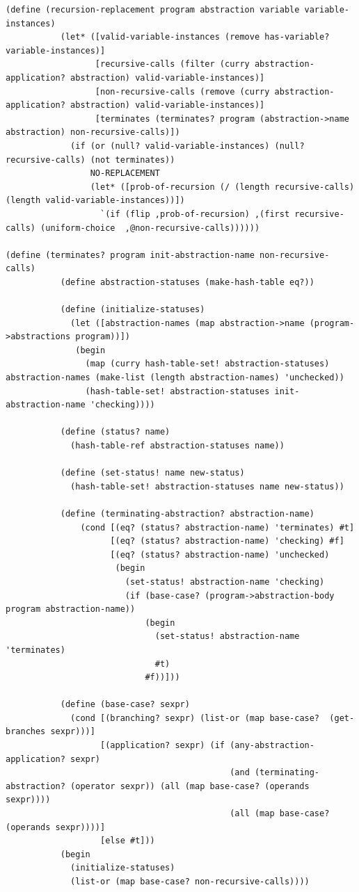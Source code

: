 \documentclass[a4paper,10pt]{article}
\begin{document}
\begin{lstlisting}[frame=trBL]
(define (recursion-replacement program abstraction variable variable-instances)
           (let* ([valid-variable-instances (remove has-variable? variable-instances)]
                  [recursive-calls (filter (curry abstraction-application? abstraction) valid-variable-instances)]
                  [non-recursive-calls (remove (curry abstraction-application? abstraction) valid-variable-instances)]
                  [terminates (terminates? program (abstraction->name abstraction) non-recursive-calls)]) 
             (if (or (null? valid-variable-instances) (null? recursive-calls) (not terminates))
                 NO-REPLACEMENT
                 (let* ([prob-of-recursion (/ (length recursive-calls) (length valid-variable-instances))])
                   `(if (flip ,prob-of-recursion) ,(first recursive-calls) (uniform-choice  ,@non-recursive-calls))))))

(define (terminates? program init-abstraction-name non-recursive-calls)
           (define abstraction-statuses (make-hash-table eq?))

           (define (initialize-statuses)
             (let ([abstraction-names (map abstraction->name (program->abstractions program))])
              (begin
                (map (curry hash-table-set! abstraction-statuses) abstraction-names (make-list (length abstraction-names) 'unchecked))
                (hash-table-set! abstraction-statuses init-abstraction-name 'checking))))

           (define (status? name)
             (hash-table-ref abstraction-statuses name))

           (define (set-status! name new-status)
             (hash-table-set! abstraction-statuses name new-status))
           
           (define (terminating-abstraction? abstraction-name)
               (cond [(eq? (status? abstraction-name) 'terminates) #t]
                     [(eq? (status? abstraction-name) 'checking) #f]
                     [(eq? (status? abstraction-name) 'unchecked)
                      (begin
                        (set-status! abstraction-name 'checking)
                        (if (base-case? (program->abstraction-body program abstraction-name))
                            (begin
                              (set-status! abstraction-name 'terminates)
                              #t)
                            #f))]))
           
           (define (base-case? sexpr)
             (cond [(branching? sexpr) (list-or (map base-case?  (get-branches sexpr)))]
                   [(application? sexpr) (if (any-abstraction-application? sexpr)
                                             (and (terminating-abstraction? (operator sexpr)) (all (map base-case? (operands sexpr))))
                                             (all (map base-case? (operands sexpr))))]
                   [else #t]))
           (begin
             (initialize-statuses)
             (list-or (map base-case? non-recursive-calls))))
\end{lstlisting}
\end{document}
